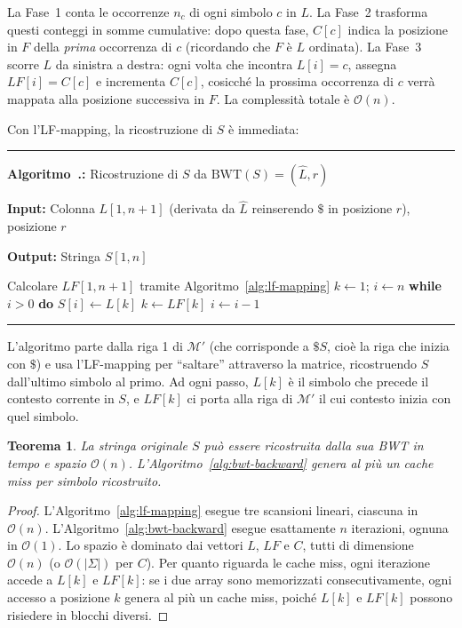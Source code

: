 \documentclass[12pt, a4paper, oneside]{book}
\newcounter{algocf}[chapter]
\renewcommand{\thealgocf}{\thechapter.\arabic{algocf}}
\newenvironment{algorithm}[1][H]{%
  \refstepcounter{algocf}%
  \par\medskip\noindent\rule{\linewidth}{0.4pt}\par\smallskip
}{%
  \par\smallskip\noindent\rule{\linewidth}{0.4pt}\par\medskip
}
\newcommand{\algcaption}[1]{\noindent\textbf{Algoritmo~\thealgocf:} #1\par\smallskip}
\newcommand{\KwIn}[1]{\noindent\textbf{Input:} #1\par}
\newcommand{\KwOut}[1]{\noindent\textbf{Output:} #1\par}
\newcommand{\BlankLine}{\par\smallskip}
\newcommand{\While}[1]{\noindent\textbf{while} #1 \textbf{do}}
\theoremstyle{plain}
\newtheorem{teorema}{Teorema}[chapter]
\theoremstyle{definition}
\theoremstyle{remark}
\newcommand{\OO}[1]{\mathcal{O}\!\left(#1\right)}
\newcommand{\bwt}{\mathrm{BWT}}
\begin{document}
La Fase~1 conta le occorrenze $n_c$ di ogni simbolo $c$ in $L$. La Fase~2 trasforma questi conteggi in somme cumulative: dopo questa fase, $C[c]$ indica la posizione in $F$ della \emph{prima} occorrenza di $c$ (ricordando che $F$ è $L$ ordinata). La Fase~3 scorre $L$ da sinistra a destra: ogni volta che incontra $L[i] = c$, assegna $LF[i] = C[c]$ e incrementa $C[c]$, cosicché la prossima occorrenza di $c$ verrà mappata alla posizione successiva in $F$. La complessità totale è $\OO{n}$.

Con l'LF-mapping, la ricostruzione di $S$ è immediata:

\begin{algorithm}[H]
\algcaption{Ricostruzione di $S$ da $\bwt(S) = (\widehat{L}, r)$}
\label{alg:bwt-backward}
\KwIn{Colonna $L[1, n+1]$ (derivata da $\widehat{L}$ reinserendo $\$$ in posizione $r$), posizione $r$}
\KwOut{Stringa $S[1, n]$}
\BlankLine
Calcolare $LF[1, n+1]$ tramite Algoritmo~\ref{alg:lf-mapping}\;
$k \gets 1$; $i \gets n$\;
\While{$i > 0$}{
  $S[i] \gets L[k]$\;
  $k \gets LF[k]$\;
  $i \gets i - 1$\;
}
\end{algorithm}

L'algoritmo parte dalla riga 1 di $\mathcal{M}'$ (che corrisponde a $\$S$, cioè la riga che inizia con $\$$) e usa l'LF-mapping per ``saltare'' attraverso la matrice, ricostruendo $S$ dall'ultimo simbolo al primo. Ad ogni passo, $L[k]$ è il simbolo che precede il contesto corrente in $S$, e $LF[k]$ ci porta alla riga di $\mathcal{M}'$ il cui contesto inizia con quel simbolo.

\begin{teorema}
\label{thm:bwt-reconstruction}
La stringa originale $S$ può essere ricostruita dalla sua BWT in tempo e spazio $\OO{n}$. L'Algoritmo~\ref{alg:bwt-backward} genera al più un cache miss per simbolo ricostruito.
\end{teorema}

\begin{proof}
L'Algoritmo~\ref{alg:lf-mapping} esegue tre scansioni lineari, ciascuna in $\OO{n}$. L'Algoritmo~\ref{alg:bwt-backward} esegue esattamente $n$ iterazioni, ognuna in $\OO{1}$. Lo spazio è dominato dai vettori $L$, $LF$ e $C$, tutti di dimensione $\OO{n}$ (o $\OO{|\Sigma|}$ per $C$). Per quanto riguarda le cache miss, ogni iterazione accede a $L[k]$ e $LF[k]$: se i due array sono memorizzati consecutivamente, ogni accesso a posizione $k$ genera al più un cache miss, poiché $L[k]$ e $LF[k]$ possono risiedere in blocchi diversi.
\end{proof}
\end{document}

